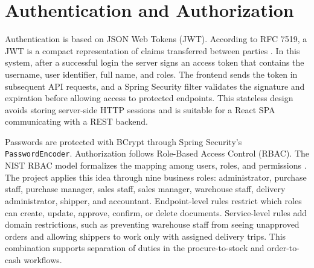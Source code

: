 \section{Authentication and Authorization}
Authentication is based on JSON Web Tokens (JWT). According to RFC 7519, a JWT is
a compact representation of claims transferred between parties \cite{rfc7519}.
In this system, after a successful login the server signs an access token that
contains the username, user identifier, full name, and roles. The frontend sends
the token in subsequent API requests, and a Spring Security filter validates the
signature and expiration before allowing access to protected endpoints. This
stateless design avoids storing server-side HTTP sessions and is suitable for a
React SPA communicating with a REST backend.

Passwords are protected with BCrypt through Spring Security's
\texttt{Password\allowbreak Encoder}. Authorization follows Role-Based Access Control
(RBAC). The NIST RBAC model formalizes the mapping among users, roles, and
permissions \cite{sandhu2000nist}. The project applies this idea through nine
business roles: administrator, purchase staff, purchase manager, sales staff,
sales manager, warehouse staff, delivery administrator, shipper, and accountant.
Endpoint-level rules restrict which roles can create, update, approve, confirm,
or delete documents. Service-level rules add domain restrictions, such as
preventing warehouse staff from seeing unapproved orders and allowing shippers to
work only with assigned delivery trips. This combination supports separation of
duties in the procure-to-stock and order-to-cash workflows.
